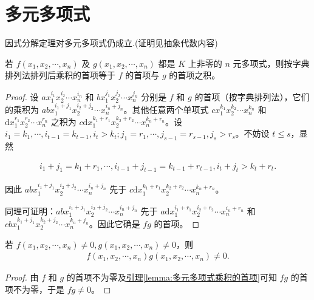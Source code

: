 \documentclass[../../main.tex]{subfiles}
\begin{document}
\section{多元多项式}

因式分解定理对多元多项式仍成立.(证明见抽象代数内容)

\begin{lemma}\label{lemma:多元多项式乘积的首项}
若 $f(x_1, x_2, \cdots, x_n)$ 及 $g(x_1, x_2, \cdots, x_n)$ 都是 $K$ 上非零的 $n$ 元多项式，则按字典排列法排列后乘积的首项等于 $f$ 的首项与 $g$ 的首项之积。
\end{lemma}
\begin{proof}
设 $ax_1^{i_1} x_2^{i_2} \cdots x_n^{i_n}$ 和 $bx_1^{j_1} x_2^{j_2} \cdots x_n^{j_n}$ 分别是 $f$ 和 $g$ 的首项（按字典排列法），它们的乘积为 $abx_1^{i_1 + j_1} x_2^{i_2 + j_2} \cdots x_n^{i_n + j_n}$。其他任意两个单项式 $cx_1^{k_1} x_2^{k_2} \cdots x_n^{k_n}$ 和 $\mathrm{d}x_1^{r_1} x_2^{r_2} \cdots x_n^{r_n}$ 之积为 $c\mathrm{d}x_1^{k_1 + r_1} x_2^{k_2 + r_2} \cdots x_n^{k_n + r_n}$。设 $i_1 = k_1, \cdots, i_{t-1} = k_{t-1}, i_t > k_t; j_1 = r_1, \cdots, j_{s-1} = r_{s-1}, j_s > r_s$。不妨设 $t \leqslant  s$，显然

\begin{align*}
i_1 + j_1 = k_1 + r_1, \cdots, i_{t-1} + j_{t-1} = k_{t-1} + r_{t-1}, i_t + j_t > k_t + r_t.
\end{align*}

因此 $abx_1^{i_1 + j_1} x_2^{i_2 + j_2} \cdots x_n^{i_n + j_n}$ 先于 $c\mathrm{d}x_1^{k_1 + r_1} x_2^{k_2 + r_2} \cdots x_n^{k_n + r_n}$。

同理可证明：$abx_1^{i_1 + j_1} x_2^{i_2 + j_2} \cdots x_n^{i_n + j_n}$ 先于 $a\mathrm{d}x_1^{i_1 + r_1} x_2^{i_2 + r_2} \cdots x_n^{i_n + r_n}$ 和 $cbx_1^{k_1 + j_1} x_2^{k_2 + j_2} \cdots x_n^{k_n + j_n}$。因此它确是 $fg$ 的首项。

\end{proof}

\begin{proposition}[多元多项式的整性]\label{proposition:多元多项式的整性}
若 $f(x_1, x_2, \cdots, x_n) \neq 0, g(x_1, x_2, \cdots, x_n) \neq 0$，则
\begin{align*}
f(x_1, x_2, \cdots, x_n)g(x_1, x_2, \cdots, x_n) \neq 0.
\end{align*}
\end{proposition}
\begin{proof}
由 $f$ 和 $g$ 的首项不为零及\hyperref[lemma:多元多项式乘积的首项]{引理\ref{lemma:多元多项式乘积的首项}}可知 $fg$ 的首项不为零，于是 $fg \neq 0$。

\end{proof}
\end{document}
